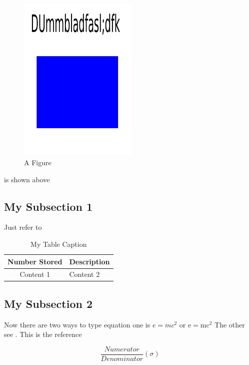 \documentclass{icldt}
\begin{document}
\begin{figure}[!htpb]
\centering
\includegraphics[height=8cm]{dummypic}
\caption{A Figure} \label{MyFigure}
\end{figure}

 is shown above

\FloatBarrier %

\subsection{My Subsection 1}
Just refer to 

\begin{table}[htbp]
\begin{tabular}[htbp]{|c|l|}
\hline
Number Stored & Description\\
\hline
Content 1 & Content 2 \\
\hline
\end{tabular}

\caption{My Table Caption} \label{MyTable}
\end{table}

\subsection{My Subsection 2}
Now there are two ways to type equation one is $e=mc^2$ or $\text{e} = \text{mc}^2$ The other see . This is the reference \cite{RN2}

\begin{equation} \label{MyEq1}
\frac{Numerator}{Denominator} \left( \sigma \right)
\end{equation}
\end{document}
